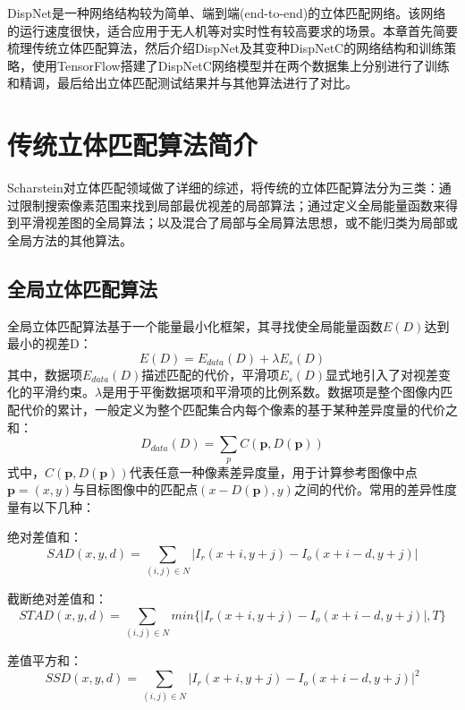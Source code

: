 DispNet\cite{mayer2016large}是一种网络结构较为简单、端到端(end-to-end)的立体匹配网络。该网络的运行速度很快，适合应用于无人机等对实时性有较高要求的场景。本章首先简要梳理传统立体匹配算法，然后介绍DispNet及其变种DispNetC的网络结构和训练策略，使用TensorFlow搭建了DispNetC网络模型并在两个数据集上分别进行了训练和精调，最后给出立体匹配测试结果并与其他算法进行了对比。


\section{传统立体匹配算法简介}
Scharstein\cite{Scharstein2002}对立体匹配领域做了详细的综述，将传统的立体匹配算法分为三类：通过限制搜索像素范围来找到局部最优视差的局部算法；通过定义全局能量函数来得到平滑视差图的全局算法；以及混合了局部与全局算法思想，或不能归类为局部或全局方法的其他算法。

\subsection{全局立体匹配算法}
全局立体匹配算法基于一个能量最小化框架，其寻找使全局能量函数$E(D)$达到最小的视差D：
%
\begin{equation}\label{eq:4_0_energy_function}
E(D) = E_{data}(D) + \lambda E_s(D)
\end{equation}
其中，数据项$E_{data}(D)$描述匹配的代价，平滑项$E_s(D)$显式地引入了对视差变化的平滑约束。$\lambda$是用于平衡数据项和平滑项的比例系数。数据项是整个图像内匹配代价的累计，一般定义为整个匹配集合内每个像素的基于某种差异度量的代价之和：
%
\begin{equation}\label{eq:4_0_energy_function_data_term}
D_{data}(D) = \sum_{p} C(\mathbf{p}, D(\mathbf{p}))
\end{equation}
式中，$C(\mathbf{p}, D(\mathbf{p}))$代表任意一种像素差异度量，用于计算参考图像中点$\mathbf{p} = (x,y)$与目标图像中的匹配点$(x-D(\mathbf{p}),y)$之间的代价。常用的差异性度量有以下几种：

绝对差值和：
\[ SAD(x,y,d) = \sum_{(i,j) \in N} |I_r(x+i, y+j) - I_o(x+i-d, y+j)|  \]

截断绝对差值和：
\[ STAD(x,y,d) = \sum_{(i,j) \in N} min \{ |I_r(x+i, y+j) - I_o(x+i-d, y+j)|  , T \} \]

差值平方和：
\[ SSD(x,y,d) = \sum_{(i,j) \in N} |I_r(x+i, y+j) - I_o(x+i-d, y+j)|^2  \]

